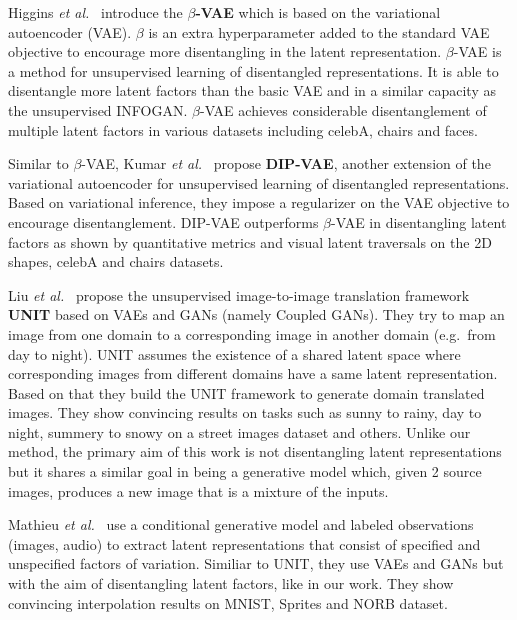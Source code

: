 \documentclass[a4paper,12pt]{report}
\begin{document}
\par Higgins \textit{et al.}~\cite{betaVAE} introduce the \textbf{$\beta$-VAE} which is based on the variational autoencoder (VAE). $\beta$ is an extra hyperparameter added to the standard VAE objective to encourage more disentangling in the latent representation. $\beta$-VAE is a method for unsupervised learning of disentangled representations. It is able to disentangle more latent factors than the basic VAE and in a similar capacity as the unsupervised INFOGAN. $\beta$-VAE achieves considerable disentanglement of multiple latent factors in various datasets including celebA, chairs and faces.

Similar to $\beta$-VAE, Kumar \textit{et al.}~\cite{DIPVAE} propose \textbf{DIP-VAE}, another extension of the variational autoencoder for unsupervised learning of disentangled representations. Based on variational inference, they impose a regularizer on the VAE objective to encourage disentanglement. DIP-VAE outperforms $\beta$-VAE in disentangling latent factors as shown by quantitative metrics and visual latent traversals on the 2D shapes, celebA and chairs datasets.

Liu \textit{et al.}~\cite{UNIT} propose the unsupervised image-to-image translation framework \textbf{UNIT} based on VAEs and GANs (namely Coupled GANs). They try to map an image from one domain to a corresponding image in another domain (e.g.\ from day to night). UNIT assumes the existence of a shared latent space where corresponding images from different domains have a same latent representation. Based on that they build the UNIT framework to generate domain translated images. They show convincing results on tasks such as sunny to rainy, day to night, summery to snowy on a street images dataset and others. Unlike our method, the primary aim of this work is not disentangling latent representations but it shares a similar goal in being a generative model which, given 2 source images, produces a new image that is a mixture of the inputs.

Mathieu \textit{et al.}~\cite{1611.03383} use a conditional generative model and labeled observations (images, audio) to extract latent representations that consist of specified and unspecified factors of variation. Similiar to UNIT, they use VAEs and GANs but with the aim of disentangling latent factors, like in our work. They show convincing interpolation results on MNIST, Sprites and NORB dataset.
\end{document}
